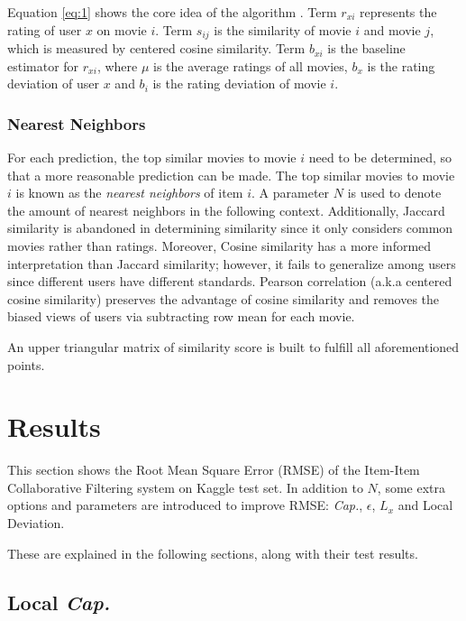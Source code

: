 \documentclass{ece}
\begin{document}
Equation \eqref{eq:1} shows the core idea of the algorithm \cite{mmds_org}.
Term $r_{xi}$ represents the rating of user $x$ on movie $i$.
Term $s_{ij}$ is the similarity of movie $i$ and movie $j$, which is measured by centered cosine similarity.
Term $b_{xi}$ is the baseline estimator for $r_{xi}$, where $\mu$ is the average ratings of all movies, $b_x$ is the rating deviation of user $x$ and $b_i$ is the rating deviation of movie $i$.

\subsubsection{Nearest Neighbors}
\label{knn}
For each prediction, the top similar movies to movie $i$ need to be determined, so that a more reasonable prediction can be made.
The top similar movies to movie $i$ is known as the \textit{nearest neighbors} of item $i$.
A parameter $N$ is used to denote the amount of nearest neighbors in the following context.
Additionally, Jaccard similarity is abandoned in determining similarity since it only considers common movies rather than ratings.
Moreover, Cosine similarity has a more informed interpretation than Jaccard similarity; however, it fails to generalize among users since different users have different standards.
Pearson correlation (a.k.a centered cosine similarity) preserves the advantage of cosine similarity and removes the biased views of users via subtracting row mean for each movie.

An upper triangular matrix of similarity score is built to fulfill all aforementioned points.

\section{Results}

This section shows the Root Mean Square Error (RMSE) of the Item-Item Collaborative Filtering system on Kaggle test set.
In addition to $N$, some extra options and parameters are introduced to improve RMSE:
\textit{Cap.},
$\epsilon$,
$L_x$ and Local Deviation.

These are explained in the following sections, along with their test results.

\subsection{Local \textit{Cap.}}
\end{document}
